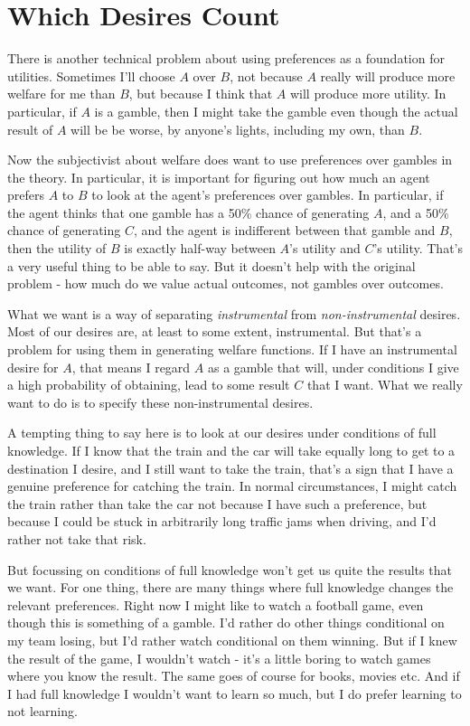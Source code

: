 \section{Which Desires Count}
There is another technical problem about using preferences as a foundation for utilities. Sometimes I'll choose $A$ over $B$, not because $A$ really will produce more welfare for me than $B$, but because I think that $A$ will produce more utility. In particular, if $A$ is a gamble, then I might take the gamble even though the actual result of $A$ will be be worse, by anyone's lights, including my own, than $B$.

Now the subjectivist about welfare does want to use preferences over gambles in the theory. In particular, it is important for figuring out how much an agent prefers $A$ to $B$ to look at the agent's preferences over gambles. In particular, if the agent thinks that one gamble has a 50\% chance of generating $A$, and a 50\% chance of generating $C$, and the agent is indifferent between that gamble and $B$, then the utility of $B$ is exactly half-way between $A$'s utility and $C$'s utility. That's a very useful thing to be able to say. But it doesn't help with the original problem - how much do we value actual outcomes, not gambles over outcomes.

What we want is a way of separating \textit{instrumental} from \textit{non-instrumental} desires. Most of our desires are, at least to some extent, instrumental. But that's a problem for using them in generating welfare functions. If I have an instrumental desire for $A$, that means I regard $A$ as a gamble that will, under conditions I give a high probability of obtaining, lead to some result $C$ that I want. What we really want to do is to specify these non-instrumental desires.

A tempting thing to say here is to look at our desires under conditions of full knowledge. If I know that the train and the car will take equally long to get to a destination I desire, and I still want to take the train, that's a sign that I have a genuine preference for catching the train. In normal circumstances, I might catch the train rather than take the car not because I have such a preference, but because I could be stuck in arbitrarily long traffic jams when driving, and I'd rather not take that risk.

But focussing on conditions of full knowledge won't get us quite the results that we want. For one thing, there are many things where full knowledge changes the relevant preferences. Right now I might like to watch a football game, even though this is something of a gamble. I'd rather do other things conditional on my team losing, but I'd rather watch conditional on them winning. But if I knew the result of the game, I wouldn't watch - it's a little boring to watch games where you know the result. The same goes of course for books, movies etc. And if I had full knowledge I wouldn't want to learn so much, but I do prefer learning to not learning.

